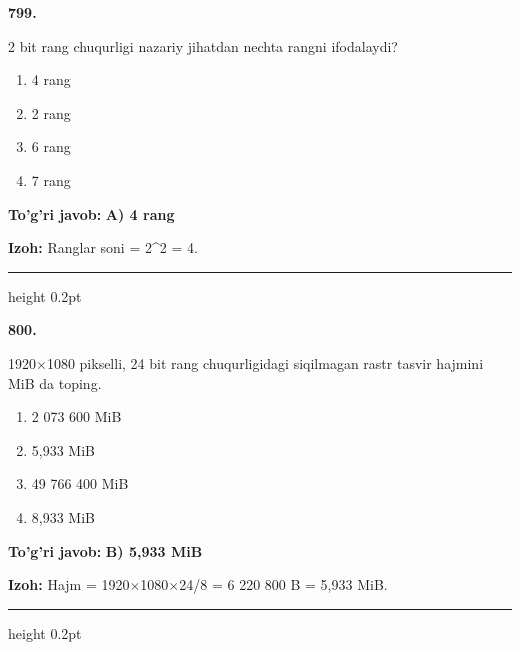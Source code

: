 \documentclass[10pt,a4paper,oneside]{article}
\begin{document}
\noindent\textbf{\color{ink}799.}
\par
2 bit rang chuqurligi nazariy jihatdan nechta rangni ifodalaydi?
\begin{enumerate}[label=\Alph*),leftmargin=9mm]
\item 4 rang
\item 2 rang
\item 6 rang
\item 7 rang
\end{enumerate}
\begin{tcolorbox}[enhanced,breakable,colback=teal!4,colframe=teal!50!black,boxrule=0.5pt,arc=1.1mm,left=3mm,right=3mm,top=1.7mm,bottom=1.7mm,before skip=2mm,after skip=2mm]
\textbf{\color{teal}To'g'ri javob:} \textbf{A) 4 rang}
\par\smallskip
\textbf{Izoh:} Ranglar soni = 2\textasciicircum{}2 = 4.
\end{tcolorbox}
\vspace{2mm}\hrule height 0.2pt \vspace{3mm}

\noindent\textbf{\color{ink}800.}
\par
1920\ensuremath{\times}1080 pikselli, 24 bit rang chuqurligidagi siqilmagan rastr tasvir hajmini MiB da toping.
\begin{enumerate}[label=\Alph*),leftmargin=9mm]
\item 2 073 600 MiB
\item 5,933 MiB
\item 49 766 400 MiB
\item 8,933 MiB
\end{enumerate}
\begin{tcolorbox}[enhanced,breakable,colback=teal!4,colframe=teal!50!black,boxrule=0.5pt,arc=1.1mm,left=3mm,right=3mm,top=1.7mm,bottom=1.7mm,before skip=2mm,after skip=2mm]
\textbf{\color{teal}To'g'ri javob:} \textbf{B) 5,933 MiB}
\par\smallskip
\textbf{Izoh:} Hajm = 1920\ensuremath{\times}1080\ensuremath{\times}24/8 = 6 220 800 B = 5,933 MiB.
\end{tcolorbox}
\vspace{2mm}\hrule height 0.2pt \vspace{3mm}
\end{document}
